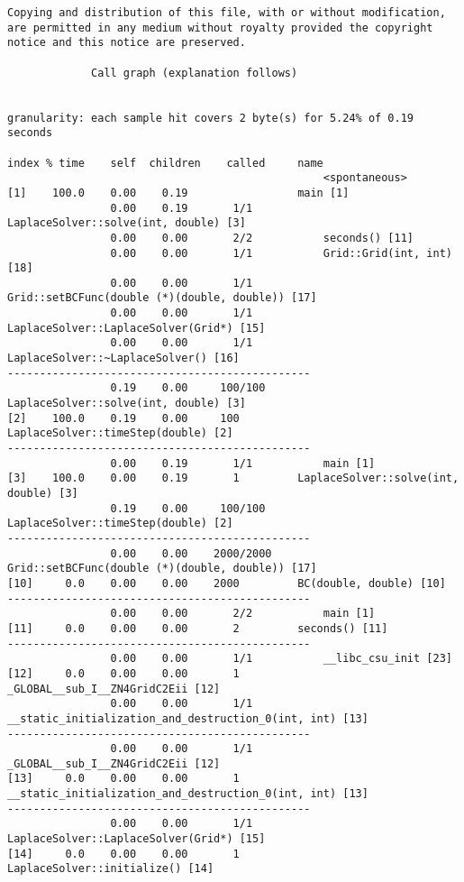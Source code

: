 \documentclass[a4paper,twosidep]{article}
\begin{document}
\begin{verbatim}
Copying and distribution of this file, with or without modification,
are permitted in any medium without royalty provided the copyright
notice and this notice are preserved.

		     Call graph (explanation follows)


granularity: each sample hit covers 2 byte(s) for 5.24% of 0.19 seconds

index % time    self  children    called     name
                                                 <spontaneous>
[1]    100.0    0.00    0.19                 main [1]
                0.00    0.19       1/1           LaplaceSolver::solve(int, double) [3]
                0.00    0.00       2/2           seconds() [11]
                0.00    0.00       1/1           Grid::Grid(int, int) [18]
                0.00    0.00       1/1           Grid::setBCFunc(double (*)(double, double)) [17]
                0.00    0.00       1/1           LaplaceSolver::LaplaceSolver(Grid*) [15]
                0.00    0.00       1/1           LaplaceSolver::~LaplaceSolver() [16]
-----------------------------------------------
                0.19    0.00     100/100         LaplaceSolver::solve(int, double) [3]
[2]    100.0    0.19    0.00     100         LaplaceSolver::timeStep(double) [2]
-----------------------------------------------
                0.00    0.19       1/1           main [1]
[3]    100.0    0.00    0.19       1         LaplaceSolver::solve(int, double) [3]
                0.19    0.00     100/100         LaplaceSolver::timeStep(double) [2]
-----------------------------------------------
                0.00    0.00    2000/2000        Grid::setBCFunc(double (*)(double, double)) [17]
[10]     0.0    0.00    0.00    2000         BC(double, double) [10]
-----------------------------------------------
                0.00    0.00       2/2           main [1]
[11]     0.0    0.00    0.00       2         seconds() [11]
-----------------------------------------------
                0.00    0.00       1/1           __libc_csu_init [23]
[12]     0.0    0.00    0.00       1         _GLOBAL__sub_I__ZN4GridC2Eii [12]
                0.00    0.00       1/1           __static_initialization_and_destruction_0(int, int) [13]
-----------------------------------------------
                0.00    0.00       1/1           _GLOBAL__sub_I__ZN4GridC2Eii [12]
[13]     0.0    0.00    0.00       1         __static_initialization_and_destruction_0(int, int) [13]
-----------------------------------------------
                0.00    0.00       1/1           LaplaceSolver::LaplaceSolver(Grid*) [15]
[14]     0.0    0.00    0.00       1         LaplaceSolver::initialize() [14]

\end{verbatim}
\end{document}
